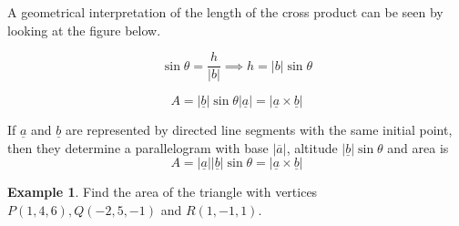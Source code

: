 \documentclass[11pt,a4paper]{article}
\theoremstyle{definition}
\newtheorem{exa}[thm]{Example}
\begin{document}
A geometrical interpretation of the length of the cross product can be seen by looking at the figure below.


\begin{figure}[H]
\centering
{}
\end{figure}

$$\sin \theta = \frac{h}{
\left|b\right|
}\implies h = \left|b\right| \sin \theta$$

$$A = \left|\underline{b}\right|\sin \theta \left|\underline{a}\right|=\left|\underline{a} \times \underline{b}\right|$$

If $\underline{a}$ and $\underline{b}$ are represented by directed line segments with the same initial point, then they determine a parallelogram with base $\left|\overline{a}\right|$, altitude $\left|\underline{b}\right|\sin \theta$ and area is $$A = \left|\underline{a}\right|\left|\underline{b}\right|\sin \theta = \left|\underline{a} \times \underline{b}\right|$$

\begin{exa}


Find the area of the triangle with vertices $P(1,4,6) , Q(-2, 5, -1)$ and $R(1,-1,1)$.
\end{exa}
\end{document}
